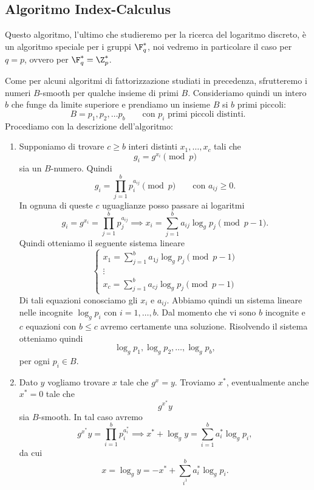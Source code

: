 \subsection{Algoritmo Index-Calculus}

	Questo algoritmo, l'ultimo che studieremo per la ricerca del logaritmo discreto, è un algoritmo speciale per i gruppi \(\F_q^*\), noi vedremo in particolare il caso per \(q=p\), ovvero per \(\F_q^* = \Z_p^*\).

	Come per alcuni algoritmi di fattorizzazione studiati in precedenza, sfrutteremo i numeri \(B\)-smooth per qualche insieme di primi \(B\).
	Consideriamo quindi un intero \(b\) che funge da limite superiore e prendiamo un insieme \(B\) si \(b\) primi piccoli:
		\[
		B = {p_1, p_2, \ldots p_b} \qquad\text{con \(p_i\) primi piccoli distinti}.
		\]
	Procediamo con la descrizione dell'algoritmo:
	\begin{enumerate}
		\item Supponiamo di trovare \(c \ge b\) interi distinti \(x_1,\ldots,x_c\) tali che
			\[
			g_i = g^{x_{i}} \pmod{p}
			\]
		sia un \(B\)-numero. Quindi
			\[
			g_i = \prod_{j=1}^b p_i^{a_{ij}} \pmod{p} \qquad\text{con }a_{ij}\ge 0.
			\]
		In ognuna di queste \(c\) uguaglianze posso passare ai logaritmi
			\[
			g_i = g^{x_i} = \prod_{j=1}^b p_j^{a_{ij}} \implies x_i = \sum_{j=1}^b a_{ij} \log_g p_j \pmod{p-1}.
			\]
		Quindi otteniamo il seguente sistema lineare
			\[
			\begin{cases}
			x_1 = \sum_{j=1}^b a_{1j} \log_g p_j \pmod{p-1}\\
			\vdots\\
			x_c = \sum_{j=1}^b a_{cj} \log_g p_j \pmod{p-1}
			\end{cases}
			\]
		Di tali equazioni conosciamo gli \(x_i\) e \(a_{ij}\).
		Abbiamo quindi un sistema lineare nelle incognite \(\log_g p_i\) con \(i=1,\ldots,b\).
		Dal momento che vi sono \(b\) incognite e \(c\) equazioni con \(b\le c\) avremo certamente una soluzione.
		Risolvendo il sistema otteniamo quindi
			\[
			\log_g p_1, \log_g p_2, \ldots, \log_g p_b,
			\]
		per ogni \(p_i \in B\).
		\item Dato \(y\) vogliamo trovare \(x\) tale che \(g^x=y\). Troviamo \(x^*\), eventualmente anche \(x^*=0\) tale che
			\[
			g^{x^*} y
			\]
		sia \(B\)-smooth. In tal caso avremo
			\[
			g^{x^*} y = \prod_{i=1}^b p_i^{a_i^*} \implies x^* + \log_g y = \sum_{i=1}^b a_i^* \log_g p_i,
			\]
		da cui
			\[
			x = \log_g y = -x^* + \sum_{i^1}^b a_i^* \log_g p_i.
			\]
	\end{enumerate}

